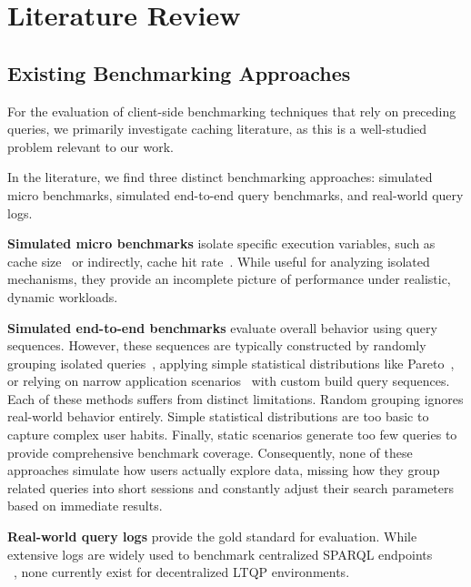 \section{Literature Review}
\subsection{Existing Benchmarking Approaches}
For the evaluation of client-side benchmarking techniques that rely on preceding queries, we primarily investigate caching literature, as this is a well-studied problem relevant to our work.

In the literature, we find three distinct benchmarking approaches: simulated micro benchmarks, simulated end-to-end query benchmarks, and real-world query logs.


\textbf{Simulated micro benchmarks} isolate specific execution variables, 
such as cache size~\cite{hartig2011caching} or indirectly, cache hit rate~\cite{nicholson2024hpcache}. 
While useful for analyzing isolated mechanisms, 
they provide an incomplete picture of performance under realistic, dynamic workloads.

\textbf{Simulated end-to-end benchmarks} evaluate overall behavior using query sequences. 
However, these sequences are typically constructed by randomly grouping 
isolated queries~\cite{o2009star,bizer2011berlin,hartig2011caching,nicholson2024hpcache,folz2016cyclades}, 
applying simple statistical distributions like Pareto~\cite{williams2011enabling,martin2010improving,arnold2014pareto}, 
or relying on narrow application scenarios~\cite{chatzopoulos2022atrapos,martin2010improving} with custom build
query sequences. 
Each of these methods suffers from distinct limitations. 
Random grouping ignores real-world behavior entirely. 
Simple statistical distributions are too basic to capture complex user habits. 
Finally, static scenarios generate too few queries to provide comprehensive benchmark coverage. 
Consequently, none of these approaches simulate how users actually explore data, 
missing how they group related queries into short sessions 
and constantly adjust their search parameters based on immediate results.

\textbf{Real-world query logs} provide the gold standard for evaluation. 
While extensive logs are widely used to benchmark centralized SPARQL endpoints\\~\cite{saleem2015lsq,stadler2024lsq,berendt2013usewod2013,zhang2016secf,papailiou2015graph,lorey2013caching}, 
none currently exist for decentralized LTQP environments. 

